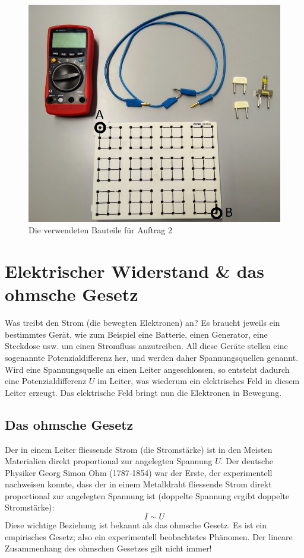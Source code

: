 \documentclass[11pt,twoside=false,open=any]{scrbook}
\begin{document}
\begin{figure}[h]
\centering
\includegraphics[scale=0.5]{Bilder/bauteile.jpg}
\caption{Die verwendeten Bauteile für Auftrag 2}
\label{fig:bauteile}
\end{figure}





\chapter{Elektrischer Widerstand \& das ohmsche Gesetz}
Was treibt den Strom (die bewegten Elektronen) an? Es braucht jeweils ein bestimmtes Gerät, wie zum Beispiel eine Batterie, einen Generator, eine Steckdose usw. um einen Stromfluss anzutreiben. All diese Geräte stellen eine sogenannte Potenzialdifferenz her, und werden daher Spannungsquellen genannt. Wird eine Spannungsquelle an einen Leiter angeschlossen, so entsteht dadurch eine Potenzialdifferenz $U$ im Leiter, was wiederum ein elektrisches Feld in diesem Leiter erzeugt. Das elektrische Feld bringt nun die Elektronen in Bewegung.

\section{Das ohmsche Gesetz} 
Der in einem Leiter fliessende Strom (die Stromstärke) ist in den Meisten Materialien direkt proportional zur angelegten Spannung $U$. Der deutsche Physiker Georg Simon Ohm (1787-1854) war der Erste, der experimentell nachweisen konnte, dass der in einem Metalldraht fliessende Strom direkt proportional zur angelegten Spannung ist (doppelte Spannung ergibt doppelte Stromstärke):
\[ I \sim U \]
Diese wichtige Beziehung ist bekannt als das ohmsche Gesetz. Es ist ein empirisches Gesetz; also ein experimentell beobachtetes Phänomen. Der lineare Zusammenhang des ohmschen Gesetzes gilt nicht immer!
\end{document}
